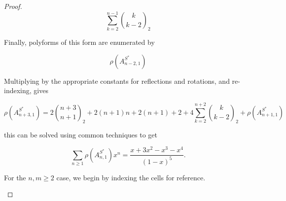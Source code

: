 \documentclass[12pt]{article}
\theoremstyle{plain}
\theoremstyle{definition}
\theoremstyle{remark}
\theoremstyle{definition}
\newcommand{\cellw}[4]{\draw[thick] ( #1 , #2 ) rectangle ( #3 , #4 );}
\newcommand{\cellb}[4]{\filldraw[black!60] ( #1 , #2 ) rectangle ( #3 , #4 ); \draw[thick] ( #1 , #2 ) rectangle ( #3 , #4 );}
\newcommand{\lablcell}[4]{\node[shape=circle,draw=white,fill=white, inner sep=0pt,minimum size=0.2cm] (A) at ( #1 , #2 ) {#3, #4};}
\begin{document}
\begin{proof}
$$ \sum_{k=2}^{n-1}\binom{k}{k-2}_2 $$

Finally, polyforms of this form are enumerated by 

\begin{center}
\end{center}

$$\rho(A^{S^*}_{n-2,1})$$

Multiplying by the appropriate constants for reflections and rotations, and re-indexing, gives

\begin{equation*}
    \rho(A^{S^*}_{n+3,1}) = 2\binom{n+3}{n+1}_2 + 2(n+1)n + 2(n+1) + 2 + 4\sum_{k=2}^{n+2}\binom{k}{k-2}_2 + \rho(A^{S^*}_{n+1,1})
\end{equation*}

this can be solved using common techniques to get

\begin{equation*}
    \sum_{n \geq 1} \rho(A^{S^*}_{n,1}) x^n = \frac{x+3x^2-x^3-x^4}{(1-x)^5}.
\end{equation*}

For the $n,m \geq 2$ case, we begin by indexing the cells for reference. 
    
\begin{center}
\end{center}
\end{proof}
\end{document}
